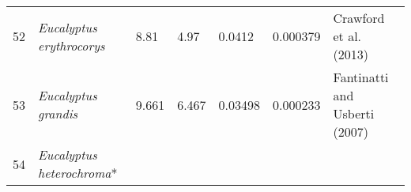 \documentclass[]{article}
\begin{document}
\begin{longtable}[]{@{}lllllll@{}}
\begin{minipage}[t]{0.05\columnwidth}
52\strut
\end{minipage} & \begin{minipage}[t]{0.23\columnwidth}\raggedright
\emph{Eucalyptus erythrocorys}\strut
\end{minipage} & \begin{minipage}[t]{0.05\columnwidth}\raggedright
8.81\strut
\end{minipage} & \begin{minipage}[t]{0.08\columnwidth}\raggedright
4.97\strut
\end{minipage} & \begin{minipage}[t]{0.08\columnwidth}\raggedright
0.0412\strut
\end{minipage} & \begin{minipage}[t]{0.08\columnwidth}\raggedright
0.000379\strut
\end{minipage} & \begin{minipage}[t]{0.23\columnwidth}\raggedright
Crawford et al. (2013)\strut
\end{minipage}\tabularnewline
\begin{minipage}[t]{0.05\columnwidth}\raggedright
53\strut
\end{minipage} & \begin{minipage}[t]{0.23\columnwidth}\raggedright
\emph{Eucalyptus grandis}\strut
\end{minipage} & \begin{minipage}[t]{0.05\columnwidth}\raggedright
9.661\strut
\end{minipage} & \begin{minipage}[t]{0.08\columnwidth}\raggedright
6.467\strut
\end{minipage} & \begin{minipage}[t]{0.08\columnwidth}\raggedright
0.03498\strut
\end{minipage} & \begin{minipage}[t]{0.08\columnwidth}\raggedright
0.000233\strut
\end{minipage} & \begin{minipage}[t]{0.23\columnwidth}\raggedright
Fantinatti and Usberti (2007)\strut
\end{minipage}\tabularnewline
\begin{minipage}[t]{0.05\columnwidth}\raggedright
54\strut
\end{minipage} & \begin{minipage}[t]{0.23\columnwidth}\raggedright
\emph{Eucalyptus heterochroma}*\strut
\end{minipage} & \begin{minipage}[t]{0.05\columnwidth}\raggedright

\end{minipage}
\end{longtable}
\end{document}
